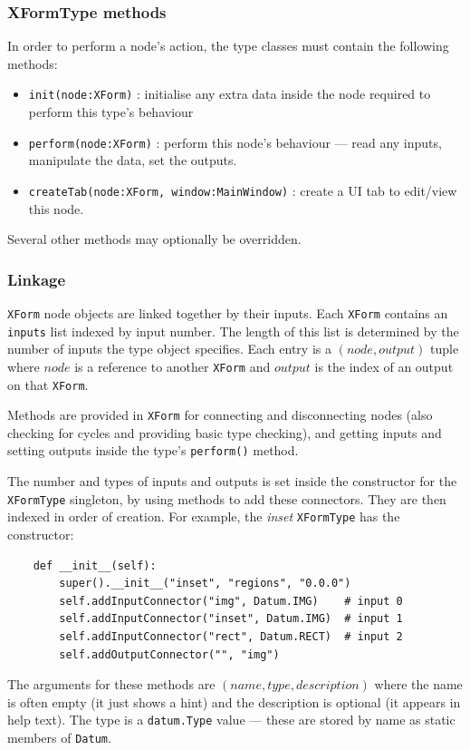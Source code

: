 \subsubsection{XFormType methods}
In order to perform a node's action, the type classes must contain
the following methods:
\begin{itemize}
\item \texttt{init(node:XForm)} : initialise any extra data inside
the node required to perform this type's behaviour
\item \texttt{perform(node:XForm)} : perform this node's behaviour ---
read any inputs, manipulate the data, set the outputs.
\item \texttt{createTab(node:XForm, window:MainWindow)} : create a UI tab to edit/view this node.
\end{itemize}
Several other methods may optionally be overridden.

\subsubsection{Linkage}
\label{linkage}
\texttt{XForm} node objects are linked together by their inputs.
Each \texttt{XForm} contains an \texttt{inputs} list indexed by
input number. The length of this list is determined by the number
of inputs the type object specifies. Each entry is a $(node,output)$
tuple where $node$ is a reference to another \texttt{XForm} and
$output$ is the index of an output on that \texttt{XForm}.

Methods are provided in \texttt{XForm} for connecting and disconnecting nodes
(also checking for cycles and providing basic type checking), and getting
inputs and setting outputs inside the type's \texttt{perform()} method.

The number and types of inputs and outputs is set inside the 
constructor for the \texttt{XFormType} singleton, by using methods
to add these connectors. They are then indexed in order of creation.
For example, the \emph{inset} \texttt{XFormType} has the constructor:
\begin{lstlisting}
    def __init__(self):
        super().__init__("inset", "regions", "0.0.0")
        self.addInputConnector("img", Datum.IMG)    # input 0
        self.addInputConnector("inset", Datum.IMG)  # input 1
        self.addInputConnector("rect", Datum.RECT)  # input 2
        self.addOutputConnector("", "img")
\end{lstlisting}
The arguments for these methods are $(name,type,description)$ where the name
is often empty (it just shows a hint) and the description is optional (it appears
in help text). The type is a \texttt{datum.Type} value --- these are stored
by name as static members of \texttt{Datum}.

